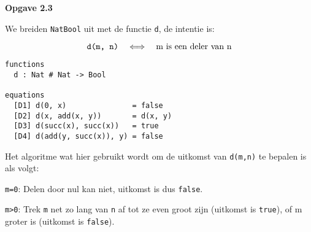 \documentclass[a4paper,11pt]{article}
\begin{document}
{\bf Opgave 2.3} %

We breiden \verb|NatBool| uit met de functie \verb|d|, de intentie is:

\begin{displaymath}
\verb|d(m, n)| \quad \Longleftrightarrow \quad \mbox{m is een deler van n}
\end{displaymath}

\begin{verbatim}
functions
  d : Nat # Nat -> Bool

equations
  [D1] d(0, x)               = false
  [D2] d(x, add(x, y))       = d(x, y)
  [D3] d(succ(x), succ(x))   = true
  [D4] d(add(y, succ(x)), y) = false
\end{verbatim}

Het algoritme wat hier gebruikt wordt om de uitkomst van \verb|d(m,n)| te
bepalen is als volgt:

\begin{description}

\item{\verb|m=0|:}
Delen door nul kan niet, uitkomst is dus \verb|false|.

\item{\verb|m>0|:}
Trek \verb|m| net zo lang van \verb|n| af tot ze even groot zijn (uitkomst is
\verb|true|), of m groter is (uitkomst is \verb|false|).

\end{description}
\end{document}
